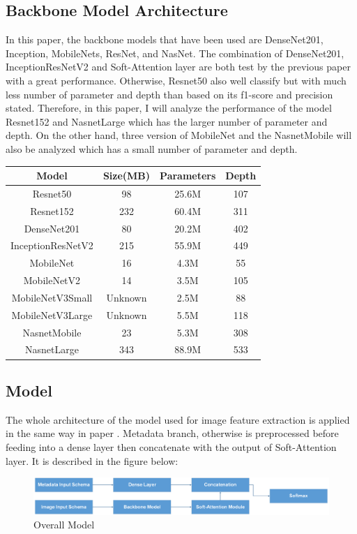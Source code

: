 \subsection{Backbone Model Architecture}
In this paper, the backbone models that have been used are DenseNet201\cite{06993}, Inception\cite{00567}, MobileNets\cite{04861}\cite{04381}\cite{02244}, ResNet\cite{03385}\cite{05027}, and NasNet\cite{07012}. The combination of DenseNet201, InceptionResNetV2 and Soft-Attention layer are both test by the previous paper\cite{03358} with a great performance. Otherwise, Resnet50 also well classify but with much less number of parameter and depth than based on its f1-score and precision stated. Therefore, in this paper, I will analyze the performance of the model Resnet152 and NasnetLarge which has the larger number of parameter and depth. On the other hand, three version of MobileNet and the NasnetMobile will also be analyzed which has a small number of parameter and depth.  
\begin{center}
	\begin{tabular}{|c | c c c|} 
		\hline
		Model & Size(MB) & Parameters & Depth \\ 
		\hline
		Resnet50 & 98 & 25.6M & 107 \\ 
		\hline
		Resnet152 & 232 & 60.4M & 311 \\ 
		\hline
		DenseNet201 & 80 & 20.2M & 402 \\
		\hline
		InceptionResNetV2 & 215 & 55.9M & 449 \\
		\hline
		MobileNet & 16 & 4.3M & 55 \\ 
		\hline
		MobileNetV2 & 14 & 3.5M & 105 \\ 
		\hline
		MobileNetV3Small & Unknown & 2.5M & 88 \\ 
		\hline
		MobileNetV3Large & Unknown & 5.5M & 118 \\
		\hline
		NasnetMobile & 23 & 5.3M & 308 \\
		\hline
		NasnetLarge & 343 & 88.9M & 533 \\ 
		\hline
	\end{tabular}
\end{center}

\subsection{Model}
The whole architecture of the model used for image feature extraction is applied in the same way in paper \cite{03358}. Metadata branch, otherwise is preprocessed before feeding into a dense layer then concatenate with the output of Soft-Attention layer. It is described in the figure below:
\begin{figure}[h]
	\centering
	\includegraphics[width=1\linewidth]{Diagram/MainModel}
	\caption{Overall Model}
	\label{fig:mainmodel}
\end{figure}
